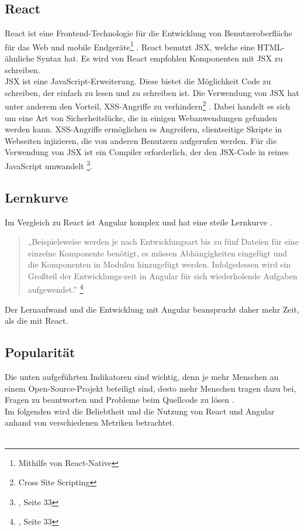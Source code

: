 \subsection*{React}
React ist eine Frontend-Technologie für die Entwicklung von Benutzeroberfläche für das Web und mobile Endgeräte\footnote{Mithilfe von React-Native} \cite{GH08}. React benutzt JSX, welche eine HTML-ähnliche Syntax hat. Es wird von React empfohlen Komponenten mit JSX zu schreiben\cite{JSX1}. 
\\
JSX ist eine JavaScript-Erweiterung. Diese bietet die Möglichkeit Code zu schreiben, der einfach zu lesen und zu schreiben ist. Die Verwendung von JSX hat unter anderem den Vorteil, XSS-Angriffe zu verhindern\footnote{Cross Site Scripting{\cite{OWASP}}} \cite{JSX1}. Dabei handelt es sich um eine Art von Sicherheitslücke, die in einigen Webanwendungen gefunden werden kann. XSS-Angriffe ermöglichen es Angreifern, clientseitige Skripte in Webseiten injizieren, die von anderen Benutzern aufgerufen werden. Für die Verwendung von JSX ist ein Compiler erforderlich, der den JSX-Code in reines JavaScript umwandelt \footnote{{\cite{E01}, Seite 33}}.

\subsection{Lernkurve}
Im Vergleich zu React ist Angular komplex und hat eine steile Lernkurve {\cite{E01}}.
\begin{quote}
  „Beispielsweise werden je nach Entwicklungsart bis zu fünf Dateien für eine einzelne Komponente benötigt, es müssen Abhängigkeiten eingefügt und die Komponenten in Modulen hinzugefügt werden. Infolgedessen wird ein Großteil der Entwicklungs-zeit in Angular für sich wiederholende Aufgaben aufgewendet.”
  \footnote{{\cite{AN1}, Seite 33}}
\end{quote}
Der Lernaufwand und die Entwicklung mit Angular beansprucht daher mehr Zeit, als die mit React.

\subsection{Popularität}
Die unten aufgeführten Indikatoren sind wichtig, denn je mehr Menschen an einem Open-Source-Projekt beteiligt sind, desto mehr Menschen tragen dazu bei, Fragen zu beantworten und Probleme beim Quellcode zu lösen {\cite{LIN1}}.
\\
Im folgenden wird die Beliebtheit und die Nutzung von React und Angular anhand von verschiedenen Metriken betrachtet.
\\\\
